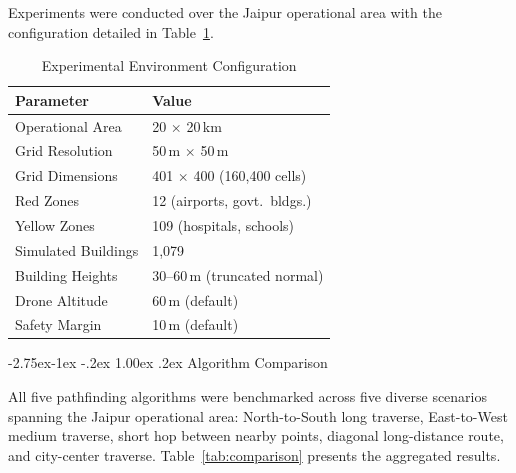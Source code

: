 \documentclass[11pt,a4paper,twocolumn]{article}
\makeatletter
\renewcommand{\subsection}{\@startsection{subsection}{2}{\z@}%
  {-2.75ex\@plus -1ex \@minus -.2ex}%
  {1.00ex \@plus .2ex}%
  {\normalfont\normalsize\bfseries\itshape}}
\makeatother
\begin{document}
Experiments were conducted over the Jaipur operational area with the configuration detailed in Table~\ref{tab:env}.

\begin{table}[!t]
\centering
\small
\caption{Experimental Environment Configuration}
\label{tab:env}
\begin{tabular}{@{}p{3.2cm}p{3.8cm}@{}}
\toprule
\textbf{Parameter} & \textbf{Value} \\
\midrule
Operational Area & 20 $\times$ 20\,km \\
Grid Resolution & 50\,m $\times$ 50\,m \\
Grid Dimensions & 401 $\times$ 400 (160,400 cells) \\
Red Zones & 12 (airports, govt.\ bldgs.) \\
Yellow Zones & 109 (hospitals, schools) \\
Simulated Buildings & 1,079 \\
Building Heights & 30--60\,m (truncated normal) \\
Drone Altitude & 60\,m (default) \\
Safety Margin & 10\,m (default) \\
\bottomrule
\end{tabular}
\end{table}


\subsection{Algorithm Comparison}

All five pathfinding algorithms were benchmarked across five diverse scenarios spanning the Jaipur operational area: North-to-South long traverse, East-to-West medium traverse, short hop between nearby points, diagonal long-distance route, and city-center traverse. Table~\ref{tab:comparison} presents the aggregated results.

\begin{table}[H]
\centering
\caption{Pathfinding Algorithm Comparison (5 Scenarios)}
\label{tab:comparison}
\end{table}
\end{document}
